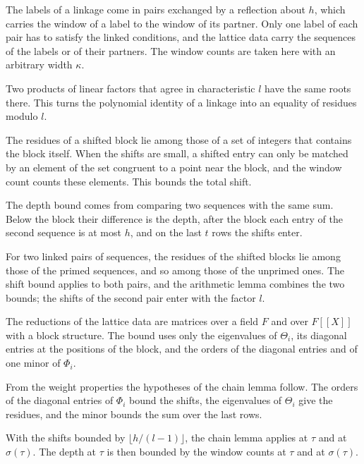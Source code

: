 The labels of a linkage come in pairs exchanged by a reflection about $h$, which carries the window of
a label to the window of its partner. Only one label of each pair has to satisfy the linked conditions,
and the lattice data carry the sequences of the labels or of their partners. The window counts are
taken here with an arbitrary width $\kappa$.

Two products of linear factors that agree in characteristic $l$ have the same roots there. This turns
the polynomial identity of a linkage into an equality of residues modulo $l$.

The residues of a shifted block lie among those of a set of integers that contains the block itself.
When the shifts are small, a shifted entry can only be matched by an element of the set congruent to a
point near the block, and the window count counts these elements. This bounds the total shift.

The depth bound comes from comparing two sequences with the same sum. Below the block their difference
is the depth, after the block each entry of the second sequence is at most $h$, and on the last $t$
rows the shifts enter.

For two linked pairs of sequences, the residues of the shifted blocks lie among those of the primed
sequences, and so among those of the unprimed ones. The shift bound applies to both pairs, and the
arithmetic lemma combines the two bounds; the shifts of the second pair enter with the factor $l$.

The reductions of the lattice data are matrices over a field $F$ and over $F[[X]]$ with a block
structure. The bound uses only the eigenvalues of $\Theta_i$, its diagonal entries at the positions of
the block, and the orders of the diagonal entries and of one minor of $\Phi_i$.

From the weight properties the hypotheses of the chain lemma follow. The orders of the diagonal entries
of $\Phi_i$ bound the shifts, the eigenvalues of $\Theta_i$ give the residues, and the minor bounds the
sum over the last rows.

With the shifts bounded by $\lfloor h/(l-1)\rfloor$, the chain lemma applies at $\tau$ and at
$\sigma(\tau)$. The depth at $\tau$ is then bounded by the window counts at $\tau$ and at
$\sigma(\tau)$.

